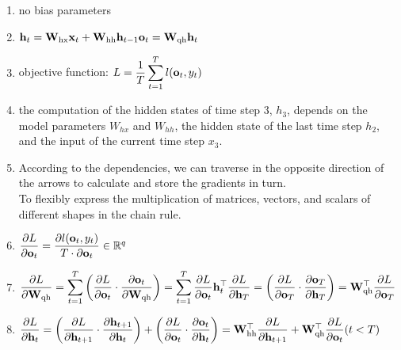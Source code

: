 \begin{enumerate}[itemsep=0.2cm]
    \item no bias parameters

    \item $
        \hfill
        \mathbf{h}_t = \mathbf{W}_\textrm{hx} \mathbf{x}_t + \mathbf{W}_\textrm{hh} \mathbf{h}_{t-1}
        \hfill
        \mathbf{o}_t = \mathbf{W}_\textrm{qh} \mathbf{h}_{t}
        \hfill
    $

    \item objective function: $L = \dfrac{1}{T} \displaystyle\sum_{t=1}^T l(\mathbf{o}_t, y_t)$

    \item the computation of the hidden states of time step 3, $h_3$, depends on the model parameters $W_{hx}$ and $W_{hh}$, the hidden state of the last time step $h_2$, and the input of the current time step $x_3$.

    \item According to the dependencies, we can traverse in the opposite direction of the arrows to calculate and store the gradients in turn.\\
    To flexibly express the multiplication of matrices, vectors, and scalars of different shapes in the chain rule.

    \item 
    $
        \dfrac{\partial L}{\partial \mathbf{o}_t} =  \dfrac{\partial l (\mathbf{o}_t, y_t)}{T \cdot \partial \mathbf{o}_t} \in \mathbb{R}^q
        \hfill
    $
    
    \item 
    $
        \dfrac{\partial L}{\partial \mathbf{W}_\textrm{qh}}
        = \dsum_{t=1}^T \left(\dfrac{\partial L}{\partial \mathbf{o}_t} \cdot \dfrac{\partial \mathbf{o}_t}{\partial \mathbf{W}_\textrm{qh}}\right)
        = \dsum_{t=1}^T \dfrac{\partial L}{\partial \mathbf{o}_t} \mathbf{h}_t^\top
        \hfill
        \dfrac{\partial L}{\partial \mathbf{h}_T} = \left(\dfrac{\partial L}{\partial \mathbf{o}_T} \cdot \dfrac{\partial \mathbf{o}_T}{\partial \mathbf{h}_T} \right) = \mathbf{W}_\textrm{qh}^\top \dfrac{\partial L}{\partial \mathbf{o}_T}
        \hfill
    $

    \item 
    $
        \dfrac{\partial L}{\partial \mathbf{h}_t} 
        = \left(\dfrac{\partial L}{\partial \mathbf{h}_{t+1}} \cdot \dfrac{\partial \mathbf{h}_{t+1}}{\partial \mathbf{h}_t} \right) + \left(\dfrac{\partial L}{\partial \mathbf{o}_t} \cdot \dfrac{\partial \mathbf{o}_t}{\partial \mathbf{h}_t} \right) 
        = \mathbf{W}_\textrm{hh}^\top \dfrac{\partial L}{\partial \mathbf{h}_{t+1}} + \mathbf{W}_\textrm{qh}^\top \dfrac{\partial L}{\partial \mathbf{o}_t}
        \hfill
        (t < T)
    $


\end{enumerate}
